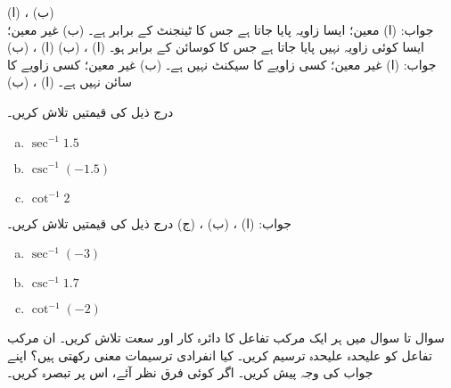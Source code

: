 (ا) ، (ب) \\
جواب:\quad
(ا) معین؛ ایسا زاویہ پایا جاتا ہے جس کا ٹینجنٹ  کے برابر ہے۔ (ب) غیر معین؛ ایسا کوئی زاویہ نہیں پایا جاتا ہے جس کا کوسائن  کے برابر ہو۔
(ا) ، (ب) 
(ا) ، (ب) \\
جواب:\quad
(ا) غیر معین؛ کسی  زاویے کا سیکنٹ  نہیں ہے۔ (ب) غیر معین؛ کسی زاویے کا سائن  نہیں ہے۔
(ا) ، (ب) 

درج ذیل کی قیمتیں تلاش کریں۔
\begin{multicols}{3}
\begin{enumerate}[a.]
\item
$\sec^{-1}1.5$
\item
$\csc^{-1}(-1.5)$
\item
$\cot^{-1}2$
\end{enumerate}
\end{multicols}
جواب:\quad
(ا) ، (ب) ، (ج) 
درج ذیل کی قیمتیں تلاش کریں۔
\begin{multicols}{3}
\begin{enumerate}[a.]
\item
$\sec^{-1}(-3)$
\item
$\csc^{-1}1.7$
\item
$\cot^{-1}(-2)$
\end{enumerate}
\end{multicols}


سوال  تا سوال  میں ہر ایک مرکب تفاعل کا دائرہ کار اور سعت تلاش کریں۔ ان مرکب تفاعل کو علیحدہ علیحدہ ترسیم کریں۔ کیا انفرادی ترسیمات معنی رکھتی ہیں؟ اپنے جواب کی وجہ پیش کریں۔ اگر کوئی فرق نظر آئے، اس پر تبصرہ کریں۔

